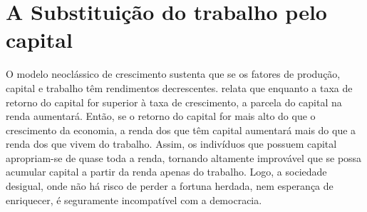 \section{A Substituição do trabalho pelo capital}

O modelo neoclássico de crescimento sustenta que se os fatores de produção, capital e trabalho têm rendimentos decrescentes.
 relata que enquanto a taxa de retorno do capital for superior à taxa de crescimento, a parcela do capital na renda aumentará.
Então, se o retorno do capital for mais alto do que o crescimento da economia, a renda dos que têm capital aumentará mais do que a renda dos que vivem do trabalho.
Assim, os indivíduos que possuem capital apropriam-se de quase toda a renda, tornando altamente improvável que se possa acumular capital a partir da renda apenas do trabalho.
Logo, a sociedade desigual, onde não há risco de perder a fortuna herdada, nem esperança de enriquecer, é seguramente incompatível com a democracia.

